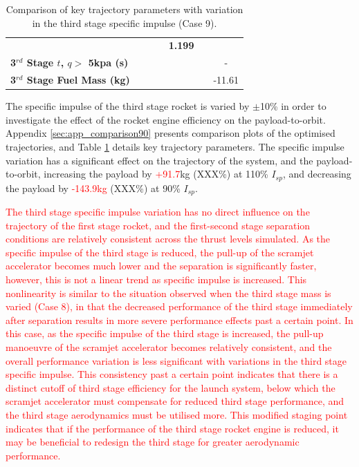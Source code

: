\begin{table}[ht]
\begin{tabular}{l c c c c c c}
		& \textbf{\thirddExergyEffISPThreeStandardNoReturn}
		& \textbf{\thirddExergyEffISPThreeOneHundredFiveNoReturn}
		& \textbf{\thirddExergyEffISPThreeOneHundredTenNoReturn}
		& \textbf{1.199}
		\\
		\textbf{3$^{rd}$ Stage $t$, $q >$ 5kpa (s)}
		& \thirdqOverFiveISPThreeNinetyNoReturn
		& \thirdqOverFiveISPThreeNinetyFiveNoReturn
		& \thirdqOverFiveISPThreeStandardNoReturn
		& \thirdqOverFiveISPThreeOneHundredFiveNoReturn
		& \thirdqOverFiveISPThreeOneHundredTenNoReturn
		& -
		\\
		\textbf{3$^{rd}$ Stage Fuel Mass (kg)}
		& \thirdmFuelISPThreeNinetyNoReturn
		& \thirdmFuelISPThreeNinetyFiveNoReturn
		& \thirdmFuelISPThreeStandardNoReturn
		& \thirdmFuelISPThreeOneHundredFiveNoReturn
		& \thirdmFuelISPThreeOneHundredTenNoReturn
		&-11.61
		\\
		\hline 
	\end{tabular} 
	\caption{Comparison of key trajectory parameters with variation in the third stage specific impulse (Case 9).}
	\label{tab:comparison90}
\end{table}

The specific impulse of the third stage rocket is varied by $\pm$10\% in order to investigate the effect of the rocket engine efficiency on the payload-to-orbit. Appendix \ref{sec:app_comparison90} presents comparison plots of the optimised trajectories, and Table \ref{tab:comparison90} details key trajectory parameters. 
The specific impulse variation has a significant effect on the trajectory of the system, and the payload-to-orbit, increasing the payload by \textcolor{red}{+91.7}kg (XXX\%) at 110\% $I_{sp}$, and decreasing the payload by \textcolor{red}{-143.9kg} (XXX\%) at 90\% $I_{sp}$. 

\textcolor{red}{
The third stage specific impulse variation has no direct influence on the trajectory of the first stage rocket, and the first-second stage separation conditions are relatively consistent across the thrust levels simulated.
As the specific impulse of the third stage is reduced, the pull-up of the scramjet accelerator becomes much lower and the separation is significantly faster, however, this is not a linear trend as specific impulse is increased. This nonlinearity is similar to the situation observed when the third stage mass is varied (Case 8), in that the decreased performance of the third stage immediately after separation results in more severe performance effects past a certain point. In this case, as the specific impulse of the third stage is increased, the pull-up manoeuvre of the scramjet accelerator becomes relatively consistent, and the overall performance variation is less significant with variations in the third stage specific impulse. This consistency past a certain point indicates that there is a distinct cutoff of third stage efficiency for the launch system, below which the scramjet accelerator must compensate for reduced third stage performance, and the third stage aerodynamics must be utilised more. This modified staging point indicates that if the performance of the third stage rocket engine is reduced, it may be beneficial to redesign the third stage for greater aerodynamic performance. 
}



